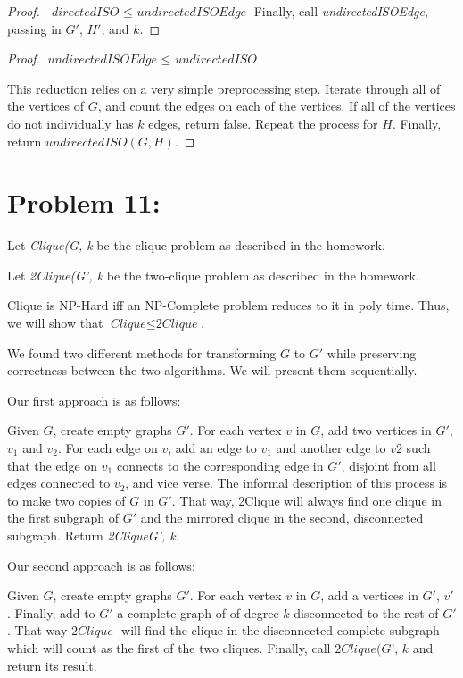 \documentclass[12pt]{article}
\begin{document}
\begin{proof}{$\textit{ directedISO } \leq \textit{ undirectedISOEdge}$}
Finally, call \textit{undirectedISOEdge}, passing in $G'$, $H'$, and $k$.

\end{proof}

\begin{proof}{$\textit{undirectedISOEdge } \leq \textit{ undirectedISO}$}

This reduction relies on a very simple preprocessing step. Iterate through all of the vertices of $G$, and count the edges on each of the vertices. If all of the vertices do not individually has $k$ edges, return false. Repeat the process for $H$. Finally, return $\textit{undirectedISO}(G, H)$.

\end{proof}

\section*{Problem 11:}

Let \textit{Clique(G, k} be the clique problem as described in the homework.

Let \textit{2Clique(G', k} be the two-clique problem as described in the homework.

Clique is NP-Hard iff an NP-Complete problem reduces to it in poly time. Thus, we will show that $\textit{Clique}  \leq \textit{2Clique}$.

We found two different methods for transforming $G$ to $G'$ while preserving correctness between the two algorithms. We will present them sequentially.

Our first approach is as follows:

Given $G$, create empty graphs $G'$. For each vertex $v$ in $G$, add two vertices in $G'$, $v_{1}$ and $v_{2}$. For each edge on $v$, add an edge to $v_{1}$ and another edge to $v{2}$ such that the edge on $v_{1}$ connects to the corresponding edge in $G'$, disjoint from all edges connected to $v_{2}$, and vice verse. The informal description of this process is to make two copies of $G$ in $G'$. That way, 2Clique will always find one clique in the first subgraph of $G'$ and the mirrored clique in the second, disconnected subgraph. Return \textit{2Clique{G', k}}.

Our second approach is as follows:

Given $G$, create empty graphs $G'$. For each vertex $v$ in $G$, add a vertices in $G'$, $v'$. Finally, add to $G'$ a complete graph of of degree $k$ disconnected to the rest of $G'$. That way $\textit{2Clique }$ will find the clique in the disconnected complete subgraph which will count as the first of the two cliques. Finally, call $\textit{2Clique(G', k}$ and return its result.
\end{document}
